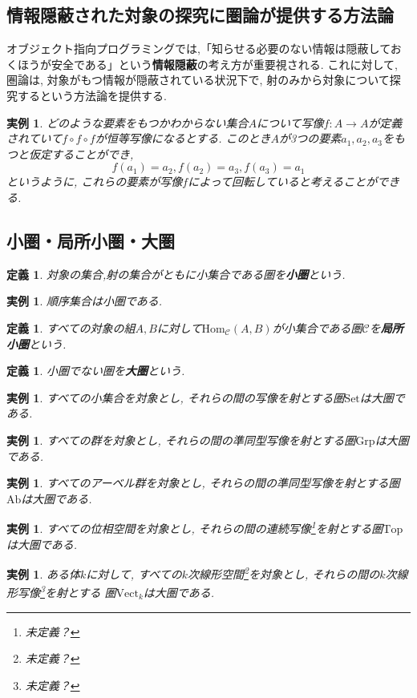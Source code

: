 \documentclass[dvipdfmx]{jsbook}
\theoremstyle{plain}
\newtheorem{Def}[thm]{定義}
\newtheorem{example}[thm]{実例}
\begin{document}
\subsection{情報隠蔽された対象の探究に圏論が提供する方法論}
オブジェクト指向プログラミングでは,「知らせる必要のない情報は隠蔽しておくほうが安全である」という{\bf 情報隠蔽}の考え方が重要視される.
これに対して, 圏論は, 対象がもつ情報が隠蔽されている状況下で, 射のみから対象について探究するという方法論を提供する.
\begin{example}
どのような要素をもつかわからない集合$A$について写像$f:A\rightarrow A$が定義されていて$f\circ f\circ f$が恒等写像になるとする.
このとき$A$が3つの要素$a_1,a_2,a_3$をもつと仮定することができ,
\[
f(a_1)=a_2, f(a_2)=a_3, 
f(a_3)=a_1
\]
というように, これらの要素が写像$f$によって回転していると考えることができる.
\end{example}
\subsection{小圏・局所小圏・大圏}
\begin{Def}
対象の集合,射の集合がともに小集合である圏を{\bf 小圏}という.
\end{Def}
\begin{example}
順序集合は小圏である.
\end{example}
\begin{Def}
すべての対象の組$A,B$に対して$\mathrm{Hom}_{\mathscr{C}}(A,B)$が小集合である圏$\mathscr{C}$を{\bf 局所小圏}という.
\end{Def}
\begin{Def}
小圏でない圏を{\bf 大圏}という.
\end{Def}

\begin{example}
すべての小集合を対象とし, それらの間の写像を射とする圏$\mathrm{Set}$は大圏である.
\end{example}
\begin{example}
すべての群を対象とし, それらの間の準同型写像を射とする圏$\mathrm{Grp}$は大圏である.
\end{example}
\begin{example}
すべてのアーベル群を対象とし, それらの間の準同型写像を射とする圏$\mathrm{Ab}$は大圏である.
\end{example}
\begin{example}
すべての位相空間を対象とし, それらの間の連続写像\footnote{未定義？}を射とする圏$\mathrm{Top}$は大圏である.
\end{example}
\begin{example}
ある体$k$に対して,
すべての$k$次線形空間\footnote{未定義？}を対象とし,
それらの間の$k$次線形写像\footnote{未定義？}を射とする
圏$\mathrm{Vect}_k$は大圏である.
\end{example}
\end{document}
